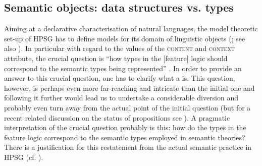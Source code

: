 \documentclass[output=paper
 	        ,biblatex
                ,babelshorthands
                ,newtxmath
                ,draftmode
                ,colorlinks, citecolor=brown
]{langscibook}
\begin{document}
  
\subsection{Semantic objects: data structures vs. types}
\label{sec:semantic-objects}

Aiming at a declarative characterisation of natural languages, the model theoretic set-up of HPSG has to define models for its domain of linguistic objects  (\citealt[Section 3]{Levine:Meurers:2006}; see also ).
%
In particular with regard to the values of the \textsc{content} and \textsc{context} attribute, the crucial question is \enquote{how types in the [feature] logic should correspond to the semantic types being represented}  \citep[]{Penn:2000}.
%
In order to provide an answer to this crucial question, one has to clarify what a  is. 
%
This question, however, is perhaps even more far-reaching and intricate than the initial one and following it further would lead us to undertake a considerable diversion and probably even turn away from the actual point of the initial question (but for a recent related discussion on the status of propositions see \citealt{King:Soames:Speaks:2014}).
%
A pragmatic interpretation of the crucial question probably is this: how do the types in the feature logic correspond to the semantic types employed in semantic theories?
%
There is a justification for this restatement from the actual semantic practice in HPSG (cf. ).
\end{document}
